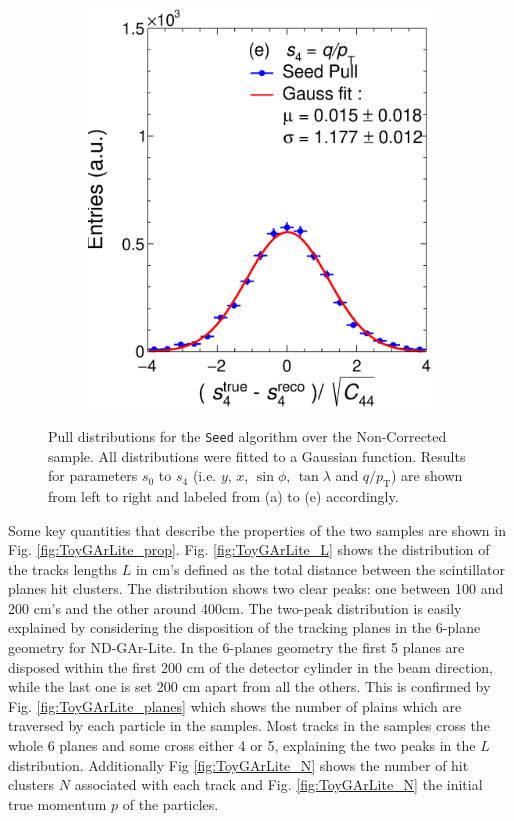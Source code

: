 \begin{figure}[t]
\begin{subfigure}{0.32\textwidth}
         \includegraphics[width=\textwidth]{figures/ch4-KF_NDGArLite/Toy/NoCorr/UnitSeed_p4.eps}
         \caption{}
         \label{fig:resp4Seed_GArLite_NoCorr}
     \end{subfigure}
        \caption{Pull distributions for the \texttt{Seed} algorithm over the Non-Corrected sample. All distributions were fitted to a Gaussian function. Results for parameters $s_0$ to $s_4$ (i.e. $y$, $x$, $\sin\phi$, $\tan\lambda$ and $q/p_{\text{T}}$) are shown from left to right and labeled from (a) to (e) accordingly. }
        \label{fig:ToyUnitSeed_GArLite_NoCorr}
\end{figure}

Some key quantities that describe the properties of the two samples are shown in Fig. \ref{fig:ToyGArLite_prop}. Fig. \ref{fig:ToyGArLite_L} shows the distribution of the tracks lengths $L$ in cm's defined as the total distance between the scintillator planes hit clusters. The distribution shows two clear peaks: one between 100 and 200 cm's and the other around 400cm. The two-peak distribution is easily explained by considering the disposition of the tracking planes in the 6-plane geometry for ND-GAr-Lite. In the 6-planes geometry the first 5 planes are disposed within the first 200 cm of the detector cylinder in the beam direction, while the last one is set 200 cm apart from all the others. This is confirmed by Fig. \ref{fig:ToyGArLite_planes} which shows the number of plains which are traversed by each particle in the samples. Most tracks in the samples cross the whole 6 planes and some cross either 4 or 5, explaining the two peaks in the $L$ distribution. Additionally Fig \ref{fig:ToyGArLite_N} shows the number of hit clusters $N$ associated with each track and Fig. \ref{fig:ToyGArLite_N} the initial true momentum $p$ of the particles.


